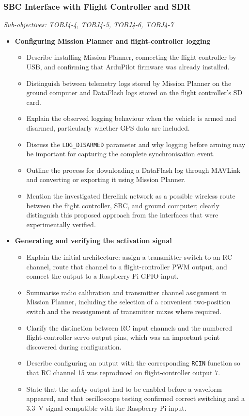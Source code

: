 \subsubsection{SBC Interface with Flight Controller and SDR}
\textit{Sub-objectives: TOBJ4-4, TOBJ4-5, TOBJ4-6, TOBJ4-7}

\begin{itemize}
    \item \textbf{Configuring Mission Planner and flight-controller logging}
    \begin{itemize}
        \item Describe installing Mission Planner, connecting the flight controller by USB, and confirming that ArduPilot firmware was already installed.
        \item Distinguish between telemetry logs stored by Mission Planner on the ground computer and DataFlash logs stored on the flight controller's SD card.
        \item Explain the observed logging behaviour when the vehicle is armed and disarmed, particularly whether GPS data are included.
        \item Discuss the \texttt{LOG\_DISARMED} parameter and why logging before arming may be important for capturing the complete synchronisation event.
        \item Outline the process for downloading a DataFlash log through MAVLink and converting or exporting it using Mission Planner.
        \item Mention the investigated Herelink network as a possible wireless route between the flight controller, SBC, and ground computer; clearly distinguish this proposed approach from the interfaces that were experimentally verified.
    \end{itemize}

    \item \textbf{Generating and verifying the activation signal}
    \begin{itemize}
        \item Explain the initial architecture: assign a transmitter switch to an RC channel, route that channel to a flight-controller PWM output, and connect the output to a Raspberry Pi GPIO input.
        \item Summarise radio calibration and transmitter channel assignment in Mission Planner, including the selection of a convenient two-position switch and the reassignment of transmitter mixes where required.
        \item Clarify the distinction between RC input channels and the numbered flight-controller servo output pins, which was an important point discovered during configuration.
        \item Describe configuring an output with the corresponding \texttt{RCIN} function so that RC channel 15 was reproduced on flight-controller output 7.
        \item State that the safety output had to be enabled before a waveform appeared, and that oscilloscope testing confirmed correct switching and a 3.3~V signal compatible with the Raspberry Pi input.
    \end{itemize}


\end{itemize}
